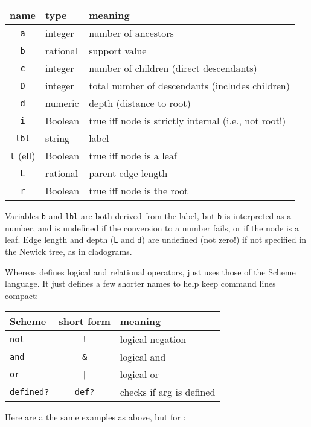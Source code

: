 \begin{center}
\begin{tabular}{cll}
name & type & meaning \\
\hline
\texttt{a} & integer & number of ancestors  \\
\texttt{b} & rational & support value \\
\texttt{c} & integer & number of children (direct descendants) \\
\texttt{D} & integer & total number of descendants (includes children) \\
\texttt{d} & numeric & depth (distance to root) \\
\texttt{i} & Boolean & true iff node is strictly internal (i.e., not root!) \\
\texttt{lbl} & string & label \\
\texttt{l} (ell) & Boolean & true iff node is a leaf \\
\texttt{L} & rational & parent edge length \\
\texttt{r} & Boolean & true iff node is the root
\end{tabular}
\end{center}

\noindent{}Variables \texttt{b} and \texttt{lbl} are both derived from the
label, but \texttt{b} is interpreted as a number, and is undefined if the
conversion to a number fails, or if the node is a leaf. Edge length and depth
(\texttt{L} and \texttt{d}) are undefined (not zero!) if not specified in the
Newick tree, as in cladograms.

Whereas \ed{} defines logical and relational operators, \sched{} just uses those
of the Scheme language. It just defines a few shorter names to help keep command
lines compact:

\begin{center}
\begin{tabular}{lcl}
Scheme & \sched{} short form & meaning \\
\hline
\texttt{not} 	& \texttt{!} 				& logical negation \\
\texttt{and} 	& \texttt{\&} 			& logical and \\
\texttt{or}  	& \texttt{|} 				& logical or \\
\texttt{defined?}	& \texttt{def?}	& checks if arg is defined
\end{tabular}
\end{center}

\noindent{}Here are a the same examples as above, but for \sched:

